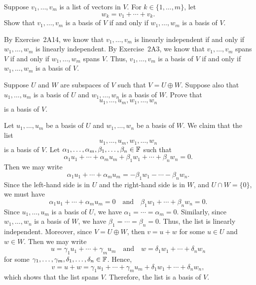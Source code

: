 \begin{exc}
\begin{exercise}
Suppose $v_1,\dots,v_m$ is a list of vectors in $V$. For $k\in\{1,\dots,m\}$, let
\[ w_k = v_1+\cdots+v_k. \]
Show that $v_1,\dots,v_m$ is a basis of $V$ if and only if $w_1,\dots,w_m$ is a
basis of $V$.
\end{exercise}
\begin{solution}
By Exercise~2A14, we know that $v_1,\dots,v_m$ is linearly independent if and
only if $w_1,\dots,w_m$ is linearly independent. By Exercise~2A3, we know that
$v_1,\dots,v_m$ spans $V$ if and only if $w_1,\dots,w_m$ spans $V$. Thus,
$v_1,\dots,v_m$ is a basis of $V$ if and only if $w_1,\dots,w_m$ is a basis
of $V$.
\end{solution}

\begin{exercise}
Suppose $U$ and $W$ are subspaces of $V$ such that $V=U\oplus W$. Suppose also
that $u_1,\dots,u_m$ is a basis of $U$ and $w_1,\dots,w_n$ is a basis of $W$.
Prove that
\[ u_1,\dots,u_m,w_1,\dots,w_n \]
is a basis of $V$.
\end{exercise}
\begin{solution}
Let $u_1,\dots,u_m$ be a basis of $U$ and $w_1,\dots,w_n$ be a basis of $W$. We
claim that the list
\[ u_1,\dots,u_m,w_1,\dots,w_n \]
is a basis of $V$. Let $\alpha_1,\dots,\alpha_m,\beta_1,\dots,\beta_n\in\mathbb{F}$ such
that
\[ \alpha_1u_1+\cdots+\alpha_mu_m+\beta_1w_1+\cdots+\beta_nw_n = 0. \]
Then we may write
\[ \alpha_1u_1+\cdots+\alpha_mu_m = -\beta_1w_1-\cdots-\beta_nw_n. \]
Since the left-hand side is in $U$ and the right-hand side is in $W$, and
$U\cap W=\{0\}$, we must have
\[ \alpha_1u_1+\cdots+\alpha_mu_m = 0 \quad\text{and}\quad
   \beta_1w_1+\cdots+\beta_nw_n = 0. \]
Since $u_1,\dots,u_m$ is a basis of $U$, we have $\alpha_1=\cdots=\alpha_m=0$.
Similarly, since $w_1,\dots,w_n$ is a basis of $W$, we have
$\beta_1=\cdots=\beta_n=0$. Thus, the list is linearly independent. Moreover,
since $V=U\oplus W$, then $v=u+w$ for some $u\in U$ and $w\in W$. Then we may
write
\[ u = \gamma_1u_1+\cdots+\gamma_mu_m \quad\text{and}\quad
   w = \delta_1w_1+\cdots+\delta_nw_n \]
for some $\gamma_1,\dots,\gamma_m,\delta_1,\dots,\delta_n\in\mathbb{F}$. Hence,
\[ v = u+w = \gamma_1u_1+\cdots+\gamma_mu_m+\delta_1w_1+\cdots+\delta_nw_n, \]
which shows that the list spans $V$. Therefore, the list is a basis of $V$.
\end{solution}


\end{exc}
